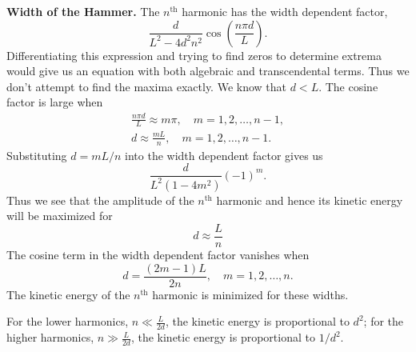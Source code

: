 {\begin{Solution}
  \begin{center}
  \end{center}

  \textbf{Width of the Hammer.}
  The $n^{\mathrm{th}}$ harmonic has the width dependent factor,
  \[
  \frac{d}{L^2 - 4 d^2 n^2} \cos\left( \frac{n \pi d}{L} \right).
  \]
  Differentiating this expression and trying to find zeros to determine 
  extrema would give us an equation with both algebraic and transcendental terms.
  Thus we don't attempt to find the maxima exactly.  We know that $d < L$.
  The cosine factor is large when
  \begin{gather*}
    \frac{n \pi d}{L} \approx m \pi, \quad m = 1, 2, \ldots, n-1, \\
    d \approx \frac{m L}{n}, \quad m = 1, 2, \ldots, n-1.
  \end{gather*}
  Substituting $d = m L / n$ into the width dependent factor gives us
  \[
  \frac{d}{L^2 (1 - 4 m^2)} (-1)^m.
  \]
  Thus we see that the amplitude of the $n^{\mathrm{th}}$ harmonic and hence 
  its kinetic energy will be maximized for 
  \[
  \boxed{
    d \approx \frac{L}{n}
    }
  \]
  The cosine term in the width dependent factor vanishes when
  \[
  d = \frac{(2 m - 1) L}{2 n}, \quad m = 1, 2, \ldots, n.
  \]
  The kinetic energy of the $n^{\mathrm{th}}$ harmonic is minimized for these
  widths.  

  For the lower harmonics, $n \ll \frac{L}{2d}$, the kinetic energy is 
  proportional to $d^2$; for the higher harmonics, $n \gg \frac{L}{2 d}$,
  the kinetic energy is proportional to $1 / d^2$.


\end{Solution}}
